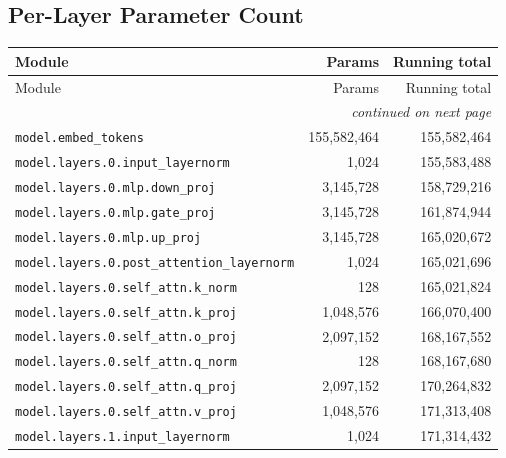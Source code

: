 \documentclass[10pt,a4paper]{article}
\theoremstyle{definition}
\begin{document}
\begin{appendices}
\section{Per-Layer Parameter Count}
\begin{longtable}{p{9.5cm}rr}
\toprule
Module & Params & Running total \\
\midrule
\endfirsthead
\toprule
Module & Params & Running total \\
\midrule
\endhead
\midrule \multicolumn{3}{r}{\textit{continued on next page}} \\
\endfoot
\bottomrule
\endlastfoot
\texttt{model.\allowbreak{}embed\_tokens} & 155,582,464 & 155,582,464 \\
\texttt{model.\allowbreak{}layers.\allowbreak{}0.\allowbreak{}input\_layernorm} & 1,024 & 155,583,488 \\
\texttt{model.\allowbreak{}layers.\allowbreak{}0.\allowbreak{}mlp.\allowbreak{}down\_proj} & 3,145,728 & 158,729,216 \\
\texttt{model.\allowbreak{}layers.\allowbreak{}0.\allowbreak{}mlp.\allowbreak{}gate\_proj} & 3,145,728 & 161,874,944 \\
\texttt{model.\allowbreak{}layers.\allowbreak{}0.\allowbreak{}mlp.\allowbreak{}up\_proj} & 3,145,728 & 165,020,672 \\
\texttt{model.\allowbreak{}layers.\allowbreak{}0.\allowbreak{}post\_attention\_layernorm} & 1,024 & 165,021,696 \\
\texttt{model.\allowbreak{}layers.\allowbreak{}0.\allowbreak{}self\_attn.\allowbreak{}k\_norm} & 128 & 165,021,824 \\
\texttt{model.\allowbreak{}layers.\allowbreak{}0.\allowbreak{}self\_attn.\allowbreak{}k\_proj} & 1,048,576 & 166,070,400 \\
\texttt{model.\allowbreak{}layers.\allowbreak{}0.\allowbreak{}self\_attn.\allowbreak{}o\_proj} & 2,097,152 & 168,167,552 \\
\texttt{model.\allowbreak{}layers.\allowbreak{}0.\allowbreak{}self\_attn.\allowbreak{}q\_norm} & 128 & 168,167,680 \\
\texttt{model.\allowbreak{}layers.\allowbreak{}0.\allowbreak{}self\_attn.\allowbreak{}q\_proj} & 2,097,152 & 170,264,832 \\
\texttt{model.\allowbreak{}layers.\allowbreak{}0.\allowbreak{}self\_attn.\allowbreak{}v\_proj} & 1,048,576 & 171,313,408 \\
\texttt{model.\allowbreak{}layers.\allowbreak{}1.\allowbreak{}input\_layernorm} & 1,024 & 171,314,432 \\

\end{longtable}
\end{appendices}
\end{document}
